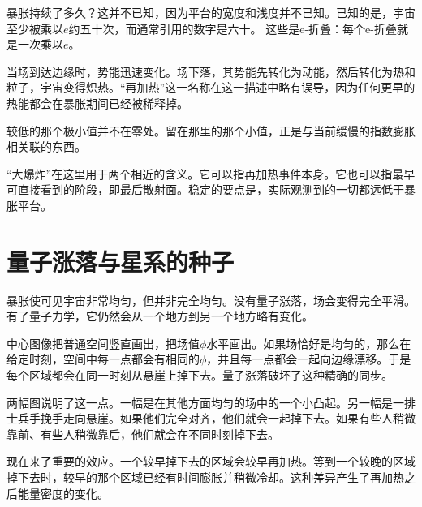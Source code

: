 暴胀持续了多久？这并不已知，因为平台的宽度和浅度并不已知。已知的是，宇宙至少被乘以\(e\)约五十次，而通常引用的数字是六十。 这些是e-折叠：每个e-折叠就是一次乘以\(e\)。

当场到达边缘时，势能迅速变化。场下落，其势能先转化为动能，然后转化为热和粒子，宇宙变得炽热。``再加热''这一名称在这一描述中略有误导，因为任何更早的热能都会在暴胀期间已经被稀释掉。

较低的那个极小值并不在零处。留在那里的那个小值，正是与当前缓慢的指数膨胀相关联的东西。

\begin{classroomqa}
\end{classroomqa}

``大爆炸''在这里用于两个相近的含义。它可以指再加热事件本身。它也可以指最早可直接看到的阶段，即最后散射面。稳定的要点是，实际观测到的一切都远低于暴胀平台。

\begin{classroomqa}
\end{classroomqa}

\section{量子涨落与星系的种子}

暴胀使可见宇宙非常均匀，但并非完全均匀。没有量子涨落，场会变得完全平滑。有了量子力学，它仍然会从一个地方到另一个地方略有变化。

中心图像把普通空间竖直画出，把场值\(\phi\)水平画出。如果场恰好是均匀的，那么在给定时刻，空间中每一点都会有相同的\(\phi\)，并且每一点都会一起向边缘漂移。于是每个区域都会在同一时刻从悬崖上掉下去。量子涨落破坏了这种精确的同步。

两幅图说明了这一点。一幅是在其他方面均匀的场中的一个小凸起。另一幅是一排士兵手挽手走向悬崖。如果他们完全对齐，他们就会一起掉下去。如果有些人稍微靠前、有些人稍微靠后，他们就会在不同时刻掉下去。

现在来了重要的效应。一个较早掉下去的区域会较早再加热。等到一个较晚的区域掉下去时，较早的那个区域已经有时间膨胀并稍微冷却。这种差异产生了再加热之后能量密度的变化。

